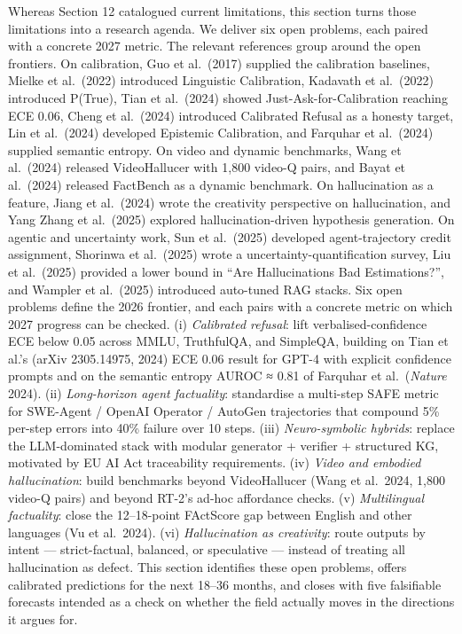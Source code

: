 Whereas Section 12 catalogued current limitations, this section turns those limitations into a research agenda. We deliver six open problems, each paired with a concrete 2027 metric. The relevant references group around the open frontiers. On calibration, Guo et al.~(2017) supplied the calibration baselines, Mielke et al.~(2022) introduced Linguistic Calibration, Kadavath et al.~(2022) introduced P(True), Tian et al.~(2024) showed Just-Ask-for-Calibration reaching ECE 0.06, Cheng et al.~(2024) introduced Calibrated Refusal as a honesty target, Lin et al.~(2024) developed Epistemic Calibration, and Farquhar et al.~(2024) supplied semantic entropy. On video and dynamic benchmarks, Wang et al.~(2024) released VideoHallucer with 1,800 video-Q pairs, and Bayat et al.~(2024) released FactBench as a dynamic benchmark. On hallucination as a feature, Jiang et al.~(2024) wrote the creativity perspective on hallucination, and Yang Zhang et al.~(2025) explored hallucination-driven hypothesis generation. On agentic and uncertainty work, Sun et al.~(2025) developed agent-trajectory credit assignment, Shorinwa et al.~(2025) wrote a uncertainty-quantification survey, Liu et al.~(2025) provided a lower bound in ``Are Hallucinations Bad Estimations?'', and Wampler et al.~(2025) introduced auto-tuned RAG stacks. Six open problems define the 2026 frontier, and each pairs with a concrete metric on which 2027 progress can be checked. (i) \emph{Calibrated refusal}: lift verbalised-confidence ECE below 0.05 across MMLU, TruthfulQA, and SimpleQA, building on Tian et al.'s (arXiv 2305.14975, 2024) ECE 0.06 result for GPT-4 with explicit confidence prompts and on the semantic entropy AUROC ≈ 0.81 of Farquhar et al.~(\emph{Nature} 2024). (ii) \emph{Long-horizon agent factuality}: standardise a multi-step SAFE metric for SWE-Agent / OpenAI Operator / AutoGen trajectories that compound 5\% per-step errors into 40\% failure over 10 steps. (iii) \emph{Neuro-symbolic hybrids}: replace the LLM-dominated stack with modular generator + verifier + structured KG, motivated by EU AI Act traceability requirements. (iv) \emph{Video and embodied hallucination}: build benchmarks beyond VideoHallucer (Wang et al.~2024, 1,800 video-Q pairs) and beyond RT-2's ad-hoc affordance checks. (v) \emph{Multilingual factuality}: close the 12--18-point FActScore gap between English and other languages (Vu et al.~2024). (vi) \emph{Hallucination as creativity}: route outputs by intent --- strict-factual, balanced, or speculative --- instead of treating all hallucination as defect. This section identifies these open problems, offers calibrated predictions for the next 18--36 months, and closes with five falsifiable forecasts intended as a check on whether the field actually moves in the directions it argues for.

